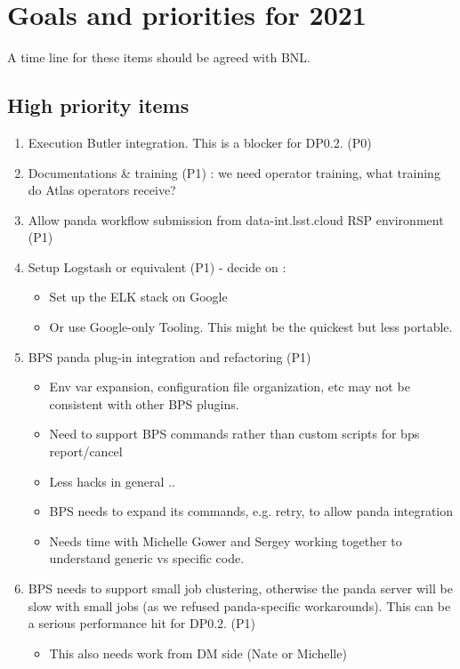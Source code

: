 \section{Goals and priorities for 2021}\label{sec:goals21}
A time line for these items should be agreed with BNL.

\subsection {High priority items } \label{sec:high}
\begin{enumerate}
\item Execution Butler integration. This is a blocker for DP0.2. (P0)
\item Documentations \& training (P1) : we need operator training,  what training do Atlas operators receive?
\item Allow panda workflow submission from data-int.lsst.cloud RSP environment (P1)
\item Setup Logstash or equivalent (P1) - decide on :
\begin{itemize}
\item Set up the ELK stack on Google
\item Or use Google-only Tooling. This might be the quickest but less portable.
\end{itemize}
\item BPS panda plug-in integration and refactoring (P1)
\begin{itemize}
\item Env var expansion, configuration file organization, etc may not be consistent with other BPS plugins.
\item Need to support BPS commands rather than custom scripts for bps report/cancel
\item Less hacks in general ..
\item BPS needs to expand its commands, e.g. retry, to allow panda integration
\item Needs time with Michelle Gower and Sergey working together to understand generic vs specific code.
\end{itemize}
\item BPS needs to support small job clustering, otherwise the panda server will be slow with small jobs (as we refused panda-specific workarounds). This can be a serious performance hit for DP0.2. (P1)
\begin{itemize}
\item This also needs work from DM side (Nate or Michelle)
\end{itemize}

\end{enumerate}

